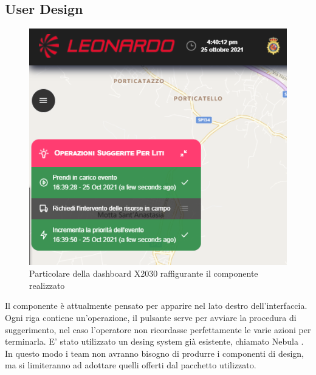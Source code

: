 \subsection{User Design}
\begin{figure}[H]
    \centering
    \includegraphics[width=140mm]{img/screenshotGUIzoom}
    \caption{Particolare della dashboard X2030 raffigurante il componente realizzato}
  \end{figure}
Il componente è attualmente pensato per apparire nel lato destro dell'interfaccia.
Ogni riga contiene un'operazione, il pulsante serve per avviare la procedura di suggerimento, nel caso 
l'operatore non ricordasse perfettamente le varie azioni per terminarla.
E' stato utilizzato un desing system già esistente, chiamato Nebula \cite{nebula}.
In questo modo i team non avranno bisogno di produrre i componenti di design, ma si limiteranno ad adottare
quelli offerti dal pacchetto utilizzato.

